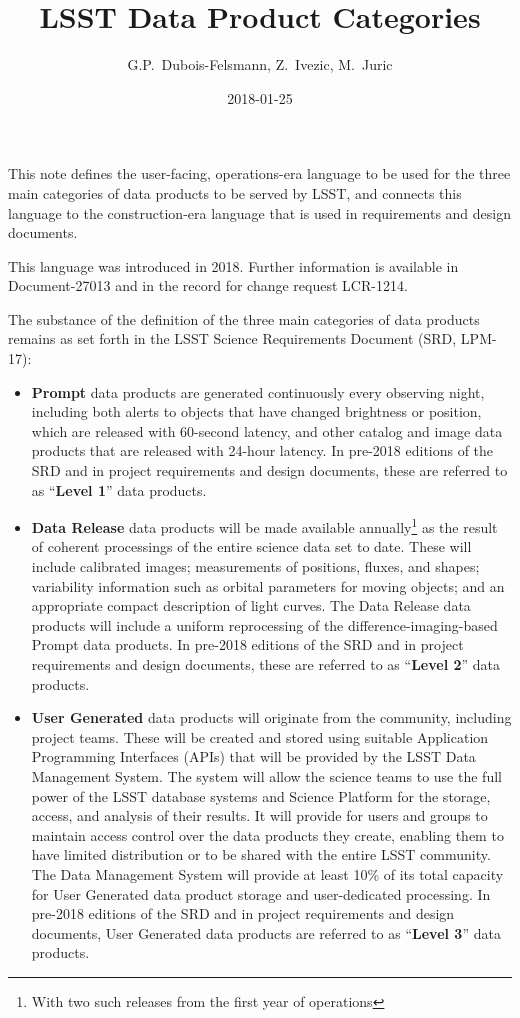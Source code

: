 \documentclass[SE]{lsstdoc}
\title{LSST Data Product Categories}
\date{2018-01-25}
\author{G.P.~Dubois-Felsmann, Z.~Ivezic, M.~Juric}
\begin{document}
\maketitle

This note defines the user-facing, operations-era language to be used for the three main categories of data products to be served by LSST, and connects this language to the construction-era language that is used in requirements and design documents.

This language was introduced in 2018.
Further information is available in Document-27013 and in the record for change request LCR-1214.

The substance of the definition of the three main categories of data products remains as set forth in the LSST Science Requirements Document (SRD, LPM-17):

\begin{itemize}
\item {\bf Prompt} data products are generated continuously every observing night, including both alerts to objects that have changed brightness or position, which are released with 60-second latency, and other catalog and image data products that are released with 24-hour latency.
In pre-2018 editions of the SRD and in project requirements and design documents, these are referred to as ``{\bf Level 1}'' data products.
\item {\bf Data Release} data products will be made available annually\footnote{With two such releases from the first year of operations} as the result of coherent processings of the entire science data set to date.
These will include calibrated images; measurements of positions, fluxes, and shapes; variability information such as orbital parameters for moving objects; and an appropriate compact description of light curves.
The Data Release data products will include a uniform reprocessing of the difference-imaging-based Prompt data products.
In pre-2018 editions of the SRD and in project requirements and design documents, these are referred to as ``{\bf Level 2}'' data products.
\item {\bf User Generated} data products will originate from the community, including project teams.
These will be created and stored using suitable Application Programming Interfaces (APIs) that will be provided by the LSST Data Management System.
The system will allow the science teams to use the full power of the LSST database systems and Science Platform for the storage, access, and analysis of their results.
It will provide for users and groups to maintain access control over the data products they create, enabling them to have limited distribution or to be shared with the entire LSST community.
The Data Management System will provide at least 10\% of its total capacity for User Generated data product storage and user-dedicated processing.
In pre-2018 editions of the SRD and in project requirements and design documents, User Generated data products are referred to as ``{\bf Level 3}'' data products.
\end{itemize}
\end{document}
